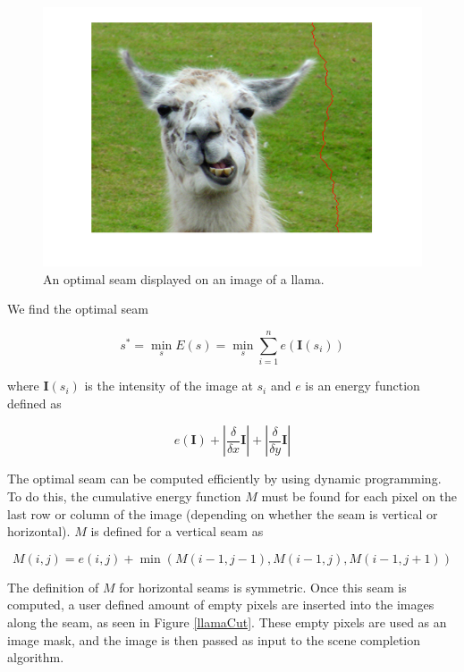 \documentclass[11pt]{amsart}
\begin{document}
\begin{figure}[htbp]
\begin{center}
\includegraphics[scale=.6]{seam.png}
\caption{An optimal seam displayed on an image of a llama.}
\label{llamaSeam}
\end{center}
\end{figure}


We find the optimal seam  

$$ 
s^* = \min_s E(s) = \min_s \sum^n_{i=1} e(\mathbf{I}(s_i))
$$

where $\mathbf{I}(s_i)$ is the intensity of the image at $s_i$ and $e$ is an energy function defined as

$$
e(\mathbf{I}) + |\frac{\delta}{\delta x} \mathbf{I} | + | \frac{\delta}{\delta y} \mathbf{I} |
$$ 

The optimal seam can be computed efficiently by using dynamic programming. To do this, the cumulative energy function $M$ must be found for each pixel on the last row or column of the image (depending on
whether the seam is vertical or horizontal). $M$ is defined for a vertical seam as

$$
M(i,j) = e(i,j) + \min(M(i-1,j-1), M(i-1, j), M(i-1, j+1))
$$

The definition of $M$ for horizontal seams is symmetric. Once this seam is computed, a user defined amount
of empty pixels are inserted into the images along the seam, as seen in Figure \ref{llamaCut}. These empty pixels are used as an image mask, and the image is then passed as input to the scene completion algorithm.
\end{document}
